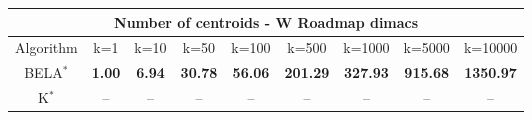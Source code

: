 \begin{tabular}{c|cccccccc}\toprule
\multicolumn{9}{c}{Number of centroids - W Roadmap dimacs}\\ \midrule
Algorithm & k=1 & k=10 & k=50 & k=100 & k=500 & k=1000 & k=5000 & k=10000 \\ \midrule
BELA$^*$ & \textbf{1.00} & \textbf{6.94} & \textbf{30.78} & \textbf{56.06} & \textbf{201.29} & \textbf{327.93} & \textbf{915.68} & \textbf{1350.97} \\
K$^*$ & -- & -- & -- & -- & -- & -- & -- & -- \\ \bottomrule 
\end{tabular}
